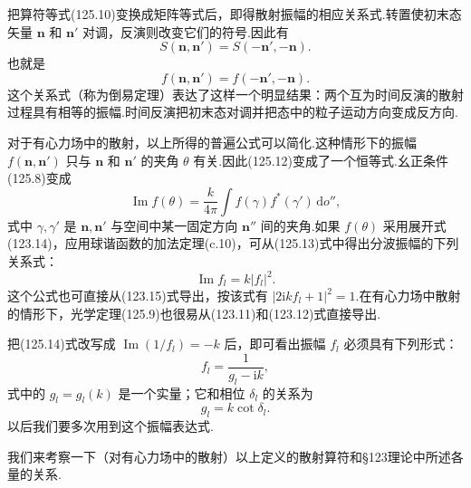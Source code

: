 把算符等式(125.10)变换成矩阵等式后，即得散射振幅的相应关系式.转置使初末态矢量 $\boldsymbol{n}$ 和 $\boldsymbol{n}'$ 对调，反演则改变它们的符号.因此有
\begin{equation}
  S(\boldsymbol{n},\boldsymbol{n}')
  =S(-\boldsymbol{n}',-\boldsymbol{n}).
\end{equation}
也就是
\begin{equation}
  f(\boldsymbol{n},\boldsymbol{n}')
  =f(-\boldsymbol{n}',-\boldsymbol{n}).
\end{equation}
这个关系式（称为倒易定理）表达了这样一个明显结果：两个互为时间反演的散射过程具有相等的振幅.时间反演把初末态对调并把态中的粒子运动方向变成反方向.

对于有心力场中的散射，以上所得的普遍公式可以简化.这种情形下的振幅 $f(\boldsymbol{n},\boldsymbol{n}')$ 只与 $\boldsymbol{n}$ 和 $\boldsymbol{n}'$ 的夹角 $\theta$ 有关.因此(125.12)变成了一个恒等式.幺正条件(125.8)变成
\begin{equation}
  \operatorname{Im}f(\theta)=\frac{k}{4\pi}
  \int f(\gamma)f^{*}(\gamma')\,\mathrm{d}o'',
\end{equation}
式中 $\gamma,\gamma'$ 是 $\boldsymbol{n},\boldsymbol{n}'$ 与空间中某一固定方向 $\boldsymbol{n}''$ 间的夹角.如果 $f(\theta)$ 采用展开式(123.14)，应用球谐函数的加法定理(c.10)，可从(125.13)式中得出分波振幅的下列关系式：
\begin{equation}
  \operatorname{Im}f_l=k|f_l|^2.
\end{equation}
这个公式也可直接从(123.15)式导出，按该式有 $|2\mathrm{i}kf_l+1|^2=1$.在有心力场中散射的情形下，光学定理(125.9)也很易从(123.11)和(123.12)式直接导出.

把(125.14)式改写成 $\operatorname{Im}(1/f_l)=-k$ 后，即可看出振幅 $f_l$ 必须具有下列形式：
\begin{equation}
  f_l=\frac{1}{g_l-\mathrm{i}k},
\end{equation}
式中的 $g_l=g_l(k)$ 是一个实量；它和相位 $\delta_l$ 的关系为
\begin{equation}
  g_l=k\cot\delta_l.
\end{equation}
以后我们要多次用到这个振幅表达式.

我们来考察一下（对有心力场中的散射）以上定义的散射算符和§123理论中所述各量的关系.


